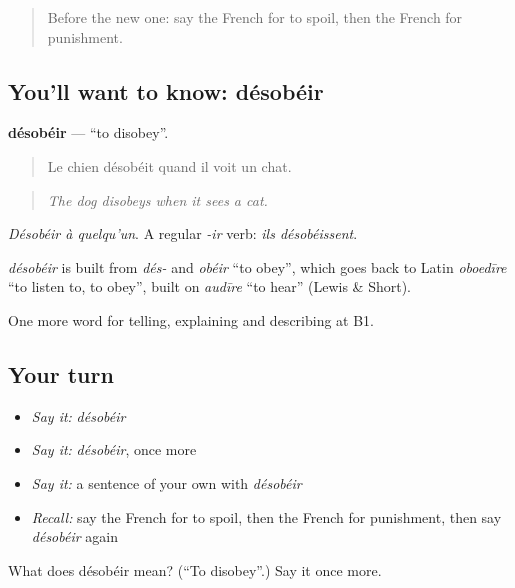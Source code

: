 \begin{quote}
Before the new one: say the French for to spoil, then the French for punishment.
\end{quote}

\subsection*{You'll want to know: désobéir}
\textbf{désobéir} — \textquotedblleft{}to disobey\textquotedblright{}.

\begin{quote}
Le chien désobéit quand il voit un chat.
\end{quote}

\begin{quote}
\emph{The dog disobeys when it sees a cat.}
\end{quote}

\emph{Désobéir à quelqu'un}. A regular \emph{-ir} verb: \emph{ils désobéissent}.

\begin{cousinweb}
\emph{désobéir} is built from \emph{dés-} and \emph{obéir} \textquotedblleft{}to obey\textquotedblright{}, which goes back to Latin \emph{oboedīre} \textquotedblleft{}to listen to, to obey\textquotedblright{}, built on \emph{audīre} \textquotedblleft{}to hear\textquotedblright{} (Lewis \& Short).
\end{cousinweb}

\begin{grammarlens}[title={What you've built}]
One more word for telling, explaining and describing at B1.
\end{grammarlens}

\subsection*{Your turn}
\begin{itemize}
\raggedright
  \item \emph{Say it:} \emph{désobéir}
  \item \emph{Say it:} \emph{désobéir}, once more
  \item \emph{Say it:} a sentence of your own with \emph{désobéir}
  \item \emph{Recall:} say the French for to spoil, then the French for punishment, then say \emph{désobéir} again
\end{itemize}

\begin{tcolorbox}[breakable,colback=teal!4,colframe=teal!35!black,title={Before you move on}]
What does désobéir mean? (\textquotedblleft{}To disobey\textquotedblright{}.) Say it once more.
\end{tcolorbox}
